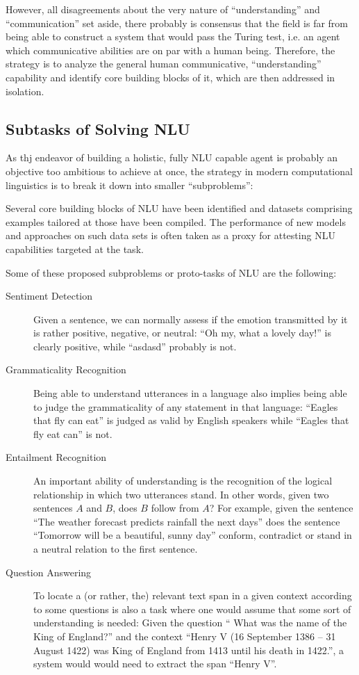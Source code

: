 However, all disagreements about the very nature of ``understanding'' and ``communication'' set aside,
there probably is consensus that the field is far from being able to construct a system that
would pass the Turing test, i.e. an agent which communicative abilities are on par with a human being.
Therefore, the strategy is to analyze the general human communicative, ``understanding'' capability
and identify core building blocks of it, which are then addressed in isolation.



\subsection{Subtasks of Solving NLU}

As thj endeavor of building a holistic, fully NLU capable agent is probably an objective too
ambitious to achieve at once, the strategy in modern computational linguistics is to break it
down into smaller ``subproblems'':

Several core building blocks of NLU have been identified and datasets comprising examples tailored at those
have been compiled. The performance of new models and approaches on such data sets is often taken as
a proxy for attesting NLU capabilities targeted at the task.

Some of these proposed subproblems or proto-tasks of NLU are the following:

\begin{description}
  \item[Sentiment Detection] Given a sentence, we can normally assess if the emotion transmitted by
      it is rather positive, negative, or neutral: ``Oh my, what a lovely day!'' is clearly positive,
      while  ``asdasd'' probably is not.
  \item[Grammaticality Recognition] Being able to understand utterances in a language also implies
      being able to judge the grammaticality of any statement in that language: ``Eagles that fly can
      eat'' is judged as valid by English speakers while ``Eagles that fly eat can'' is not.
  \item[Entailment Recognition] An important ability of understanding is the recognition of the
      logical relationship in which two utterances stand. In other words, given two sentences $A$ and
      $B$, does $B$ follow from $A$? For example, given the sentence ``The weather forecast predicts
      rainfall the next days'' does the sentence ``Tomorrow will be a beautiful, sunny day'' conform,
      contradict or stand in a neutral relation to the first sentence.
  \item[Question Answering] To locate a (or rather, the) relevant text span in a given context according to some
      questions is also a task where one would assume that some sort of understanding is needed:
      Given the question `` What was the name of the King of England?'' and the context ``Henry
      V (16 September 1386 – 31 August 1422) was King of England from 1413 until his death in
      1422.'', a system would would need to extract the span ``Henry V''.
\end{description}

